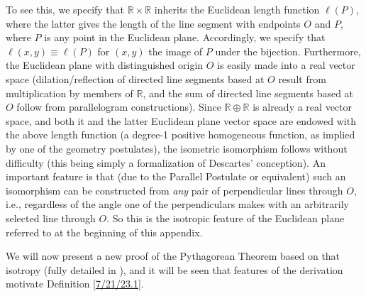 \documentclass{amsart}
\numberwithin{equation}{section}
\theoremstyle{definition}
\numberwithin{theorem}{section}
\begin{document}
To see this, we specify that $\mathbb{R}\times\mathbb{R}$  inherits the Euclidean length function $\ell(P)$, where the latter gives the length of the line segment with endpoints $O$ and $P$, where $P$ is  any point in the Euclidean plane.  Accordingly, we specify that $\ell(x,y) \equiv \ell(P)$ for $(x,y)$ the image of $P$ under the bijection.  Furthermore, the Euclidean plane with distinguished origin $O$ is easily made into a real vector space (dilation/reflection of directed line segments based at $O$ result from multiplication by members of $\mathbb{R}$, and the sum of directed line segments based at $O$ follow from parallelogram constructions).   Since $\mathbb{R}\oplus\mathbb{R}$ is already a real vector space, and both it and the latter Euclidean plane vector space are endowed with the above length function (a degree-1 positive homogeneous function, as implied by one of the geometry postulates), the isometric isomorphism follows without difficulty (this being simply a formalization of Descartes' conception).  An important feature is that (due to the  Parallel Postulate or equivalent) such an isomorphism can be constructed from {\it any} pair of perpendicular lines through $O$, i.e., regardless of the angle one of the perpendiculars makes with an arbitrarily selected line through $O$.  So this is the isotropic feature of the Euclidean plane referred to at the beginning of this appendix.    
 
 We will now present a new proof of the Pythagorean Theorem based on that isotropy (fully detailed in \cite{fgreensite:2022b}), and it will be seen that features of the derivation motivate Definition \ref{7/21/23.1}.
 
\end{document}
